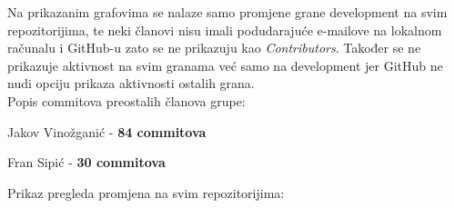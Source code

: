 		\noindent Na prikazanim grafovima se nalaze samo promjene grane development na svim repozitorijima, te neki članovi nisu imali podudarajuće e-mailove na lokalnom računalu i GitHub-u zato se ne prikazuju kao \textit{Contributors}. Također se ne prikazuje aktivnost na svim granama već samo na development jer GitHub ne nudi opciju prikaza aktivnosti ostalih grana. \\
		\newline \noindent Popis commitova preostalih članova grupe:
		\begin{packed_item}
			\item Jakov Vinožganić - \textbf{84 commitova}
			\item Fran Sipić - \textbf{30 commitova}
		\end{packed_item}
		\noindent Prikaz pregleda promjena na svim repozitorijima:
